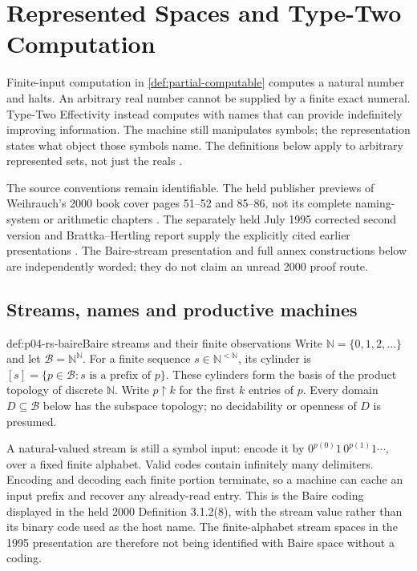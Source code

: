 \chapter{Represented Spaces and Type-Two Computation}
\label{sec:p04-represented-spaces}

Finite-input computation in \cref{def:partial-computable} computes a
natural number and halts. An arbitrary real number cannot be supplied
by a finite exact numeral. Type-Two Effectivity instead computes with
names that can provide indefinitely improving information.
The machine still manipulates symbols; the representation states
what object those symbols name.
The definitions below apply to arbitrary represented sets, not just
the reals \cite[pp.\ 4--18]{Weihrauch1995IntroductionRS}.

The source conventions remain identifiable. The held publisher
previews of Weihrauch's 2000 book cover pages 51--52 and 85--86,
not its complete naming-system or arithmetic chapters
\cite{Weihrauch2000AnalysisRS}.
The separately held July 1995 corrected second version and
Brattka--Hertling report supply the explicitly cited earlier
presentations \cite{Weihrauch1995IntroductionRS,BrattkaHertling1994RelationsRS}.
The Baire-stream presentation and full annex constructions below
are independently worded; they do not claim an unread 2000 proof route.

\section{Streams, names and productive machines}
\label{sec:p04-rs-names}

\begin{hbdefinition}{def:p04-rs-baire}{Baire streams and their finite observations}
Write \(\mathbb N=\{0,1,2,\ldots\}\) and
let \(\mathcal B=\mathbb N^{\mathbb N}\).
For a finite sequence \(s\in\mathbb N^{<\mathbb N}\), its cylinder is
\([s]=\{p\in\mathcal B:s\text{ is a prefix of }p\}\).
These cylinders form the basis of the product topology of discrete
\(\mathbb N\). Write \(p{\upharpoonright}k\) for the first \(k\)
entries of \(p\). Every domain \(D\subseteq\mathcal B\) below has
the subspace topology; no decidability or openness of \(D\) is presumed.
\end{hbdefinition}

A natural-valued stream is still a symbol input: encode it by
\(0^{p(0)}1\,0^{p(1)}1\cdots\), over a fixed finite alphabet.
Valid codes contain infinitely many delimiters.
Encoding and decoding each finite portion terminate, so a machine
can cache an input prefix and recover any already-read entry.
This is the Baire coding displayed in the held 2000
Definition 3.1.2(8), with the stream value rather than its binary
code used as the host name.
The finite-alphabet stream spaces in the 1995 presentation are
therefore not being identified with Baire space without a coding.

